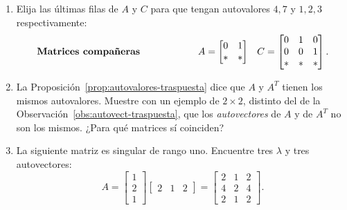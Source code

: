 \begin{enumerate}
\item Elija las últimas filas de $A$ y $C$ para que tengan autovalores $4,7$ y $1,2,3$ respectivamente:
\begin{displaymath}
\mbox{\bf Matrices compañeras}\qquad\qquad\qquad A=
  \begin{bmatrix}
  0 & 1 \\ \ast & \ast
	\end{bmatrix} \quad C=
	\begin{bmatrix}
	0 & 1 & 0 \\
	0 & 0 & 1 \\
	\ast & \ast & \ast
	\end{bmatrix} .
\end{displaymath}
\item La Proposición~\ref{prop:autovalores-traspuesta} dice que $A$ y $A^T$ tienen los
mismos autovalores. Muestre con un ejemplo de $2\times2$, distinto del de la
Observación~\ref{obs:autovect-traspuesta}, que los \emph{autovectores} de $A$ y de $A^T$
no son los mismos. ¿Para qué matrices sí coinciden?

\item La siguiente matriz es singular de rango uno. Encuentre tres $\lambda$ y tres autovectores:
$$
A=\begin{bmatrix} 1\\ 2\\ 1\end{bmatrix}
\begin{bmatrix}2 & 1 & 2\end{bmatrix}=
\begin{bmatrix} 2&1&2\\ 4&2&4\\ 2&1&2\end{bmatrix}.
$$


\end{enumerate}
